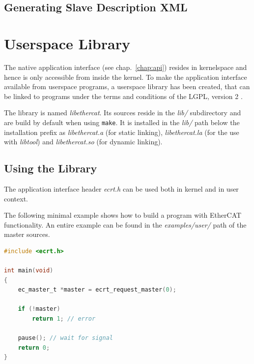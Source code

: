 \documentclass[a4paper,12pt,BCOR6mm,bibtotoc,idxtotoc]{scrbook}
\begin{document}



\subsection{Generating Slave Description XML}




\section{Userspace Library}
\label{sec:userlib}

The native application interface (see chap.~\ref{chap:api}) resides in
kernelspace and hence is only accessible from inside the kernel. To make the
application interface available from userspace programs, a userspace library
has been created, that can be linked to programs under the terms and
conditions of the LGPL, version 2 \cite{lgpl}.

The library is named \textit{libethercat}. Its sources reside in the
\textit{lib/} subdirectory and are build by default when using
\lstinline+make+. It is installed in the \textit{lib/} path below the
installation prefix as \textit{libethercat.a} (for static linking),
\textit{libethercat.la} (for the use with \textit{libtool}) and
\textit{libethercat.so} (for dynamic linking).

\subsection{Using the Library}

The application interface header \textit{ecrt.h} can be used both in kernel
and in user context.

The following minimal example shows how to build a program with EtherCAT
functionality. An entire example can be found in the \textit{examples/user/}
path of the master sources.

\begin{lstlisting}[language=C]
#include <ecrt.h>

int main(void)
{
    ec_master_t *master = ecrt_request_master(0);

    if (!master)
        return 1; // error

    pause(); // wait for signal
    return 0;
}
\end{lstlisting}
\end{document}

